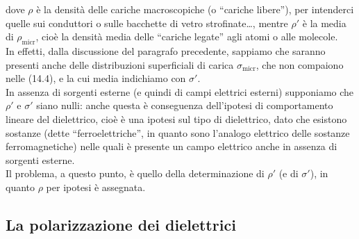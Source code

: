 dove $\rho$ \`e la densit\`a delle cariche macroscopiche (o ``cariche libere''),
per intenderci quelle sui conduttori o sulle bacchette di vetro strofinate\dots,
mentre $\rho'$ \`e la media di $\rho_\mathrm{micr}$, cio\`e la densit\`a media
delle ``cariche legate'' agli atomi o alle molecole.\\
In effetti, dalla discussione del paragrafo precedente, sappiamo che saranno
presenti anche delle distribuzioni superficiali di carica
$\sigma_\mathrm{micr}$, che non compaiono nelle (14.4), e la cui media
indichiamo con $\sigma'$.\\
In assenza di sorgenti esterne (e quindi di campi elettrici esterni) supponiamo
che $\rho'$ e $\sigma'$ siano nulli: anche questa \`e conseguenza dell'ipotesi
di comportamento lineare del dielettrico, cio\`e \`e una ipotesi sul tipo di
dielettrico, dato che esistono sostanze (dette ``ferroelettriche'', in quanto
sono l'analogo elettrico delle sostanze ferromagnetiche) nelle quali \`e
presente un campo elettrico anche in assenza di sorgenti esterne.\\
Il problema, a questo punto, \`e quello della determinazione di $\rho'$ (e di
$\sigma'$), in quanto $\rho$ per ipotesi \`e assegnata.

\subsection{La polarizzazione dei dielettrici}

